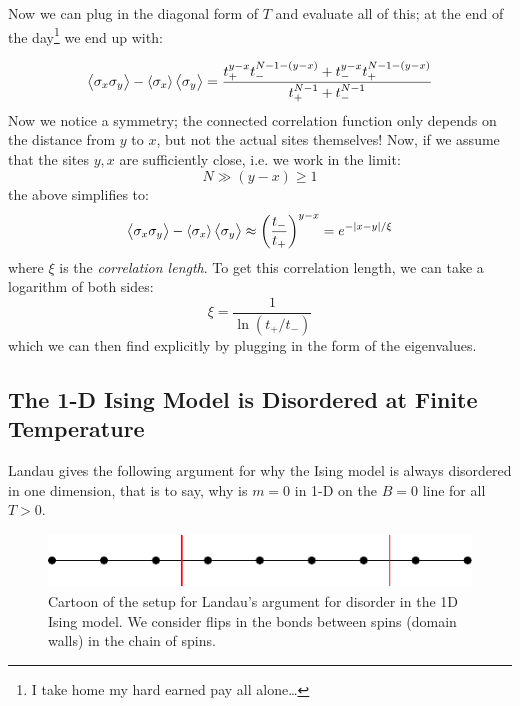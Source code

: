 Now we can plug in the diagonal form of $T$ and evaluate all of this; at the end of the day\footnote{I take home my hard earned pay all alone\ldots} we end up with:

\begin{equation}
    \left< \sigma_x \sigma_y \right> - \left< \sigma_x \right>\left< \sigma_y \right> = \frac{t_+^{y-x}t_-^{N-1-(y-x)} + t_-^{y-x}t_+^{N-1-(y-x)}}{t_+^{N-1} + t_-^{N-1}}
\end{equation}
Now we notice a symmetry; the connected correlation function only depends on the distance from $y$ to $x$, but not the actual sites themselves! Now, if we assume that the sites $y, x$ are sufficiently close, i.e. we work in the limit:
\begin{equation}
    N \gg (y - x) \geq 1
\end{equation}
the above simplifies to:
\begin{equation}
    \left< \sigma_x \sigma_y \right> - \left< \sigma_x \right>\left< \sigma_y \right> \approx \left(\frac{t_-}{t_+}\right)^{y-x} = e^{-\lvert x-y \rvert/\xi}
\end{equation}
where $\xi$ is the \emph{correlation length}. To get this correlation length, we can take a logarithm of both sides:
\begin{equation}
    \xi = \frac{1}{\ln(t_+/t_-)}
\end{equation}
which we can then find explicitly by plugging in the form of the eigenvalues.

\subsection{The 1-D Ising Model is Disordered at Finite Temperature}
Landau gives the following argument for why the Ising model is always disordered in one dimension, that is to say, why is $m = 0$ in 1-D on the $B = 0$ line for all $T> 0$. 

\begin{figure}[htbp]
    \centering
    \includegraphics{Images/fig-1DIsingdisorder.pdf}
    \caption{Cartoon of the setup for Landau's argument for disorder in the 1D Ising model. We consider flips in the bonds between spins (domain walls) in the chain of spins.}
    \label{fig-1DIsingdisorder}
\end{figure}

